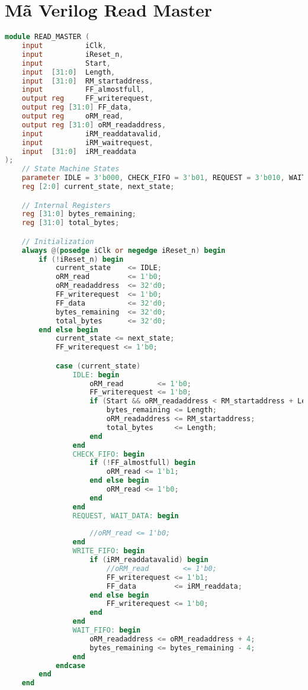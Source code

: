 \section{Mã Verilog Read Master}
\label{app:verilog_read_master}
\begin{lstlisting}[language=Verilog, caption={READ\_MASTER.v - Avalon Read Master Module}, label=lst:verilog_readmaster]
module READ_MASTER (
    input          iClk,
    input          iReset_n,
    input          Start,
    input  [31:0]  Length,
    input  [31:0]  RM_startaddress,
    input          FF_almostfull,
    output reg     FF_writerequest,
    output reg [31:0] FF_data,
    output reg     oRM_read,
    output reg [31:0] oRM_readaddress,
    input          iRM_readdatavalid,
    input          iRM_waitrequest,
    input  [31:0]  iRM_readdata
);
    // State Machine States
    parameter IDLE = 3'b000, CHECK_FIFO = 3'b01, REQUEST = 3'b010, WAIT_DATA = 3'b011, WRITE_FIFO = 3'b100, WAIT_FIFO = 3'b101;
    reg [2:0] current_state, next_state;

    // Internal Registers
    reg [31:0] bytes_remaining;
    reg [31:0] total_bytes;

    // Initialization
    always @(posedge iClk or negedge iReset_n) begin
        if (!iReset_n) begin
            current_state    <= IDLE;
            oRM_read         <= 1'b0;
            oRM_readaddress  <= 32'd0;
            FF_writerequest  <= 1'b0;
            FF_data          <= 32'd0;
            bytes_remaining  <= 32'd0;
            total_bytes      <= 32'd0;
        end else begin
            current_state <= next_state;
            FF_writerequest <= 1'b0;            

            case (current_state)
                IDLE: begin
                    oRM_read        <= 1'b0;
                    FF_writerequest <= 1'b0;
                    if (Start && oRM_readaddress < RM_startaddress + Length) begin
                        bytes_remaining <= Length;
                        oRM_readaddress <= RM_startaddress;
                        total_bytes     <= Length;
                    end
                end
                CHECK_FIFO: begin
                    if (!FF_almostfull) begin
                        oRM_read <= 1'b1;
                    end else begin
                        oRM_read <= 1'b0;
                    end
                end
                REQUEST, WAIT_DATA: begin
                    
                    //oRM_read <= 1'b0;
                end
                WRITE_FIFO: begin
                    if (iRM_readdatavalid) begin
                        //oRM_read        <= 1'b0;
                        FF_writerequest <= 1'b1;
                        FF_data         <= iRM_readdata;
                    end else begin
                        FF_writerequest <= 1'b0;
                    end
                end
                WAIT_FIFO: begin
                    oRM_readaddress <= oRM_readaddress + 4;
                    bytes_remaining <= bytes_remaining - 4;
                end
            endcase
        end
    end


\end{lstlisting}
